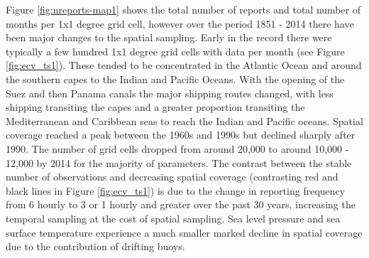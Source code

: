 Figure \ref{fig:nreports-map1} shows the total number of reports and total number of months per 1x1 degree grid cell, however over the period 1851 - 2014 there have been major changes to the spatial sampling.
Early in the record there were typically a few hundred 1x1 degree grid cells with data per month (see Figure \ref{fig:ecv_ts1}).
These tended to be concentrated in the Atlantic Ocean and around the southern capes to the Indian and Pacific Oceans.
With the opening of the Suez and then Panama canals the major shipping routes changed, with less shipping transiting the capes and a greater proportion transiting the Mediterranean and Caribbean seas to reach the Indian and Pacific oceans.
Spatial coverage reached a peak between the 1960s and 1990s but declined sharply after 1990.
The number of grid cells dropped from around 20,000 to around 10,000 - 12,000 by 2014 for the majority of parameters. 
The contrast between the stable number of observations and decreasing spatial coverage (contrasting red and black lines in Figure \ref{fig:ecv_ts1}) is due to the change in reporting frequency from 6 hourly to 3 or 1 hourly and greater over the past 30 years, increasing the temporal sampling at the cost of spatial sampling.
Sea level pressure and sea surface temperature experience a much smaller marked decline in spatial coverage due to the contribution of drifting buoys.


